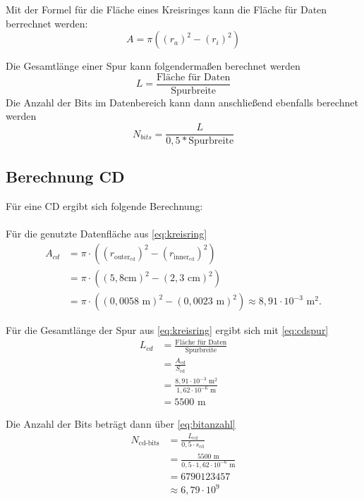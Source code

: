 \documentclass[9pt,twocolumn,twoside]{pnas-new}
\begin{document}
Mit der Formel für die Fläche eines Kreisringes \cite[Seite 147]{Bartsch2014} kann die Fläche für Daten berrechnet werden: \begin{equation} \label{eq:kreisring} A = \pi((r_a)^2-(r_i)^2)  \end{equation} 

Die Gesamtlänge einer Spur kann folgendermaßen berechnet werden \begin{equation} \label{eq:gesamtlänge} L = \frac{\mbox{Fläche für Daten}}{\mbox{Spurbreite}} \end{equation}
Die Anzahl der Bits im Datenbereich kann dann anschließend ebenfalls berechnet werden \begin{equation} \label{eq:bitanzahl} N_{bits} = \frac{L}{0,5*\mbox{Spurbreite}} \end{equation}

\subsection{Berechnung CD}
Für eine CD ergibt sich folgende Berechnung: \\ \\
Für die genutzte Datenfläche aus \eqref{eq:kreisring}
\begin{align*}
 A_{cd} &= \pi\cdot((r_{\mbox{outer}_{\mbox{cd}}})^2-(r_{\mbox{inner}_{\mbox{cd}}})^2)\\	
&= \pi\cdot((5,8\mbox{cm})^2-(2,3\mbox{ cm})^2) \\
 &=  \pi\cdot((0,0058\mbox{ m})^2-(0,0023\mbox{ m})^2) \approx  8,91\cdot10^{-3}\mbox{ m}^2.
\end{align*}

Für die Gesamtlänge der Spur aus \eqref{eq:kreisring} ergibt sich mit \eqref{eq:cdspur}
\begin{align*}
 L_{cd} &= \frac{\mbox{Fläche für Daten}}{\mbox{Spurbreite}}\\
 &= \frac{A_{\mbox{cd}}}{S_{\mbox{cd}}}\\
 &= \frac{8,91\cdot10^{-3}\mbox{ m}^2}{1,62\cdot10^{-6}\mbox{ m} }\\
 &= 5500\mbox{ m}
\end{align*}

Die Anzahl der Bits beträgt dann über \eqref{eq:bitanzahl}
\begin{align*}
N_{\mbox{cd-bits}} &=  \frac{L_{\mbox{cd}}}{0,5\cdot s_{\mbox{cd}}}\\
&= \frac{5500\mbox{ m}}{0,5 \cdot 1,62 \cdot 10^{-6}\mbox{ m}}\\
&= 6790123457 \\
&\approx 6,79 \cdot 10^9
\end{align*}
\end{document}
